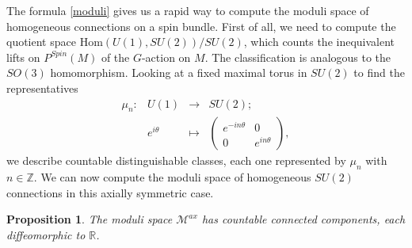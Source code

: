 \documentclass{article}
\numberwithin{equation}{section}
\newtheorem{proposition}{Proposition}[section]
\theoremstyle{definition}
\newcommand{\R}{\mathbb{R}}
\newcommand{\SP}[1]{P^{Spin}(#1)}
\begin{document}
\medskip

The formula \ref{moduli} gives us a rapid way to compute the moduli space of homogeneous connections on a spin bundle. First of all, we need to compute the quotient space $\mathrm{Hom}(U(1),SU(2))/SU(2)$, which counts the inequivalent lifts on $\SP{M}$ of the $G$-action on $M$. The classification is analogous to the $SO(3)$ homomorphism. Looking at a fixed maximal torus in $SU(2)$ to find the representatives
\begin{equation}
\begin{matrix}
        \mu_n:& U(1)&\to &SU(2);\\
        &e^{i\theta}& \mapsto&\begin{pmatrix}
        e^{-in\theta} & 0\\
        0 & e^{in\theta}
    \end{pmatrix},
    \end{matrix}
    \end{equation}
we describe countable distinguishable classes, each one represented by $\mu_n$ with $n\in\mathbb{Z}$.
We can now compute the moduli space of homogeneous $SU(2)$ connections in this axially symmetric case.
\begin{proposition}
    The moduli space $\mathcal{M}^{ax}$ has countable connected components, each diffeomorphic to $\R$.
\end{proposition}
\end{document}
